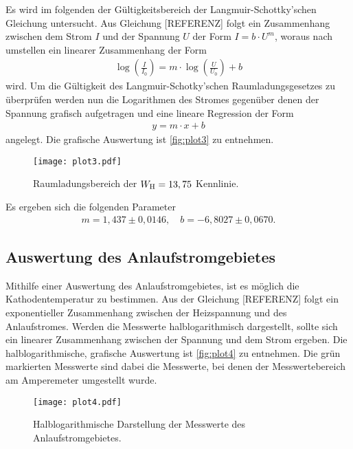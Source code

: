 Es wird im folgenden der Gültigkeitsbereich der Langmuir-Schottky'schen Gleichung untersucht.
Aus Gleichung [REFERENZ] folgt ein Zusammenhang zwischen dem Strom $I$ und der Spannung $U$ der Form $I=b\cdot U^m$, woraus nach umstellen ein linearer Zusammenhang der Form
\begin{align}
  \label{eqn:physLinReg}
  \log\left(\frac{I}{I_0}\right) = m \cdot \log\left(\frac{U}{U_0}\right) +b
\end{align}
wird. Um die Gültigkeit des Langmuir-Schotky'schen Raumladungsgesetzes zu überprüfen werden nun die Logarithmen des Stromes gegenüber denen der Spannung grafisch aufgetragen und
eine lineare Regression der Form
\begin{align}
  \label{eqn:linReg}
  y=m\cdot x+b
\end{align}
angelegt. Die grafische Auswertung ist \autoref{fig:plot3} zu entnehmen.

\begin{figure}[H]
  \centering
  \texttt{[image: plot3.pdf]}
  \caption{Raumladungsbereich der $W_{\text H} = 13,75$ Kennlinie.}
  \label{fig:plot3}
\end{figure}

\noindent
Es ergeben sich die folgenden Parameter
\begin{align*}
  m = 1,437 \pm 0,0146, \quad
  b = -6,8027 \pm 0,0670.
\end{align*}

\subsection{Auswertung des Anlaufstromgebietes}
\label{subsec:anlaufstrom}

Mithilfe einer Auswertung des Anlaufstromgebietes, ist es möglich die Kathodentemperatur zu bestimmen.
Aus der Gleichung [REFERENZ] folgt ein exponentieller Zusammenhang zwischen der Heizspannung und des Anlaufstromes.
Werden die Messwerte halblogarithmisch dargestellt, sollte sich ein linearer Zusammenhang zwischen der Spannung und dem Strom ergeben.
Die halblogarithmische, grafische Auswertung ist \autoref{fig:plot4} zu entnehmen. Die grün markierten Messwerte sind dabei die Messwerte, bei denen der
Messwertebereich am Amperemeter umgestellt wurde.

\begin{figure}[H]
  \centering
  \texttt{[image: plot4.pdf]}
  \caption{Halblogarithmische Darstellung der Messwerte des Anlaufstromgebietes.}
  \label{fig:plot4}
\end{figure}

